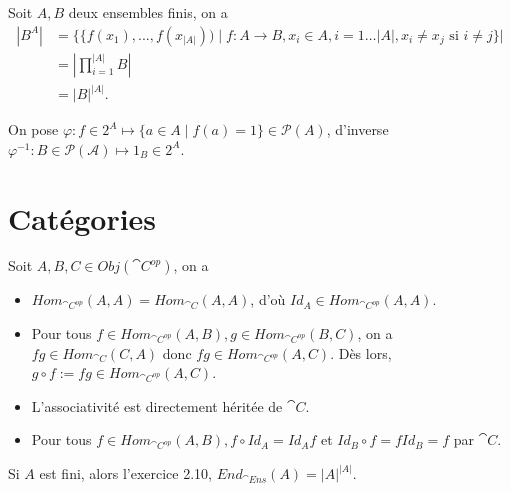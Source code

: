 \begin{exercice}
    Soit $A, B$ deux ensembles finis, on a 
    \begin{align*}
        |B^A| &= \{\{f(x_1),...,f(x_{|A|})) \mid f : A \to B, x_i \in A, i = 1\dots|A|, x_i \neq x_j \text{ si } i \neq j\}| \\
              &= \left|\prod_{i=1}^{|A|} B\right| \\
              &= |B|^{|A|}.
    \end{align*}
\end{exercice}

\begin{exercice}
    On pose $\varphi : f \in 2^A \mapsto \{a \in A \mid f(a) = 1\} \in \mathcal{P}(A)$, d'inverse $\varphi^{-1} : B \in \mathcal{P(A)} \mapsto 1_B \in 2^A$.
\end{exercice}

\section{Catégories}

\begin{exercice}
    Soit $A, B, C \in Obj(\cat{C}^{op})$, on a 
    \begin{itemize}
        \item $Hom_{\cat{C}^{op}}(A,A) = Hom_{\cat{C}}(A,A)$, d'où $Id_A \in Hom_{\cat{C}^{op}}(A,A)$.
        \item Pour tous $f \in Hom_{\cat{C}^{op}}(A,B), g \in Hom_{\cat{C}^{op}}(B,C)$, on a $fg \in Hom_{\cat{C}}(C,A)$ donc $fg \in Hom_{\cat{C}^{op}}(A,C)$.
        Dès lors, $g \circ f := fg \in Hom_{\cat{C}^{op}}(A,C)$.
        \item L'associativité est directement héritée de $\cat{C}$.
        \item Pour tous $f \in Hom_{\cat{C}^{op}}(A,B), f \circ Id_A = Id_A f$ et $Id_B \circ f = f Id_B = f$ par $\cat{C}$.
    \end{itemize}
\end{exercice}

\begin{exercice}
    Si $A$ est fini, alors l'exercice 2.10, $End_{\cat{Ens}}(A) = |A|^{|A|}$.
\end{exercice}